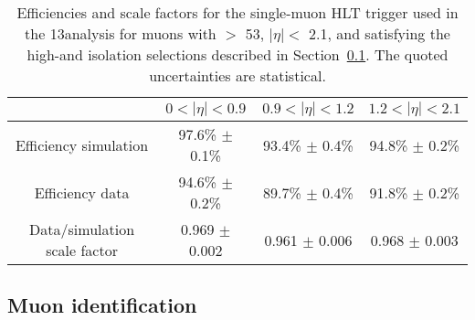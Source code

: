 \begin{table}[!htb]
\centering
\caption{Efficiencies and scale factors for the single-muon HLT trigger used in the 13\TeV analysis
for muons with \pt $>$ 53\GeV, $|\eta| <$ 2.1, and satisfying the high-\pt and isolation selections described in Section~\ref{subsec:muonid}.
The quoted uncertainties are statistical.}
\begin{tabular}{ c | c | c | c}
 & $0 < |\eta| < 0.9$ & $0.9 < |\eta| < 1.2$ & $1.2 < |\eta| < 2.1$\\
\hline
\hline
Efficiency simulation & 97.6\% $\pm$ 0.1\% & 93.4\% $\pm$ 0.4\% & 94.8\% $\pm$ 0.2\%\\
Efficiency data & 94.6\% $\pm$ 0.2\% & 89.7\% $\pm$ 0.4\% & 91.8\% $\pm$ 0.2\%\\
Data/simulation scale factor & 0.969 $\pm$ 0.002 & 0.961 $\pm$ 0.006 & 0.968 $\pm$ 0.003\\
\hline 
\end{tabular}
\label{tab:hltMueff13TeV}
\end{table}

\subsection{Muon identification}\label{subsec:muonid}

